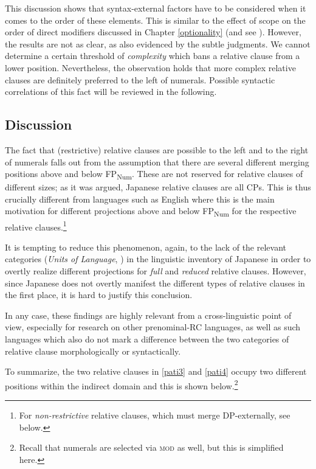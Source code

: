 \documentclass [output=book,colorlinks,citecolor=brown]{langscibook}
\begin{document}
This discussion shows that syntax-external factors have to be considered when it comes to the order of these elements. This is similar to the effect of scope on the order of direct modifiers discussed in Chapter \ref{optionality} (and see \citealt{ramchand:2014:deriving}). However, the results are not as clear, as also evidenced by the subtle judgments. We cannot determine a certain threshold of \textit{complexity} which bans a relative clause from a lower position. Nevertheless, the observation holds that more complex relative clauses are definitely preferred to the left of numerals. Possible syntactic correlations of this fact will be reviewed in the following. %

\subsection{Discussion} \label{RC discussion}

The fact that (restrictive) relative clauses are possible to the left and to the right of numerals falls out from the assumption that there are several different merging positions above and below FP\textsubscript{Num}. These are not reserved for relative clauses of different sizes; as it was argued, Japanese relative clauses are all CPs. This is thus crucially different from languages such as English where this is the main motivation for different projections above and below FP\textsubscript{Num} for the respective relative clauses.\footnote{For \textit{non-restrictive} relative clauses, which must merge DP-externally, see below.}

It is tempting to reduce this phenomenon, again, to the lack of the relevant categories (\textit{Units of Language}, \citealt{wiltschko:2014:universal}) in the linguistic inventory of Japanese in order to overtly realize different projections for \textit{full} and \textit{reduced} relative clauses. However, since Japanese does not overtly manifest the different types of relative clauses in the first place, it is hard to justify this conclusion.

In any case, these findings are highly relevant from a cross-linguistic point of view, especially for research on other prenominal-RC languages, as well as such languages which also do not mark a difference between the two categories of relative clause morphologically or syntactically.

To summarize, the two relative clauses in \ref{pati3} and \ref{pati4} occupy two different positions within the indirect domain and this is shown below.\footnote{Recall that numerals are selected via \textsc{mod} as well, but this is simplified here.}
\end{document}
